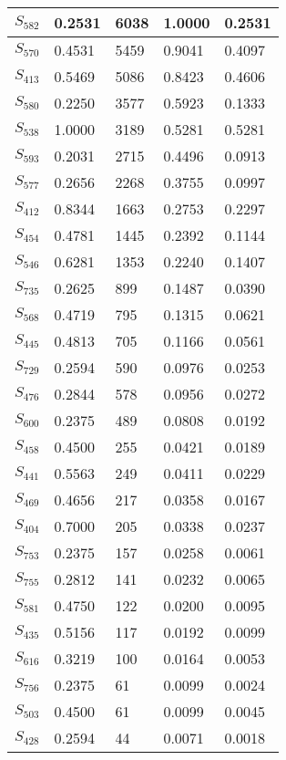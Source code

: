 \begin{xltabular}{\textwidth}{|X|X|X|X|X|}
        \hline
        \endlastfoot
    $S_{582}$ & 0.2531 & 6038 & 1.0000 & 0.2531 \\ \hline
 $S_{570}$ & 0.4531 & 5459 & 0.9041 & 0.4097 \\ \hline
 $S_{413}$ & 0.5469 & 5086 & 0.8423 & 0.4606 \\ \hline
 $S_{580}$ & 0.2250 & 3577 & 0.5923 & 0.1333 \\ \hline
 $S_{538}$ & 1.0000 & 3189 & 0.5281 & 0.5281 \\ \hline
 $S_{593}$ & 0.2031 & 2715 & 0.4496 & 0.0913 \\ \hline
 $S_{577}$ & 0.2656 & 2268 & 0.3755 & 0.0997 \\ \hline
 $S_{412}$ & 0.8344 & 1663 & 0.2753 & 0.2297 \\ \hline
 $S_{454}$ & 0.4781 & 1445 & 0.2392 & 0.1144 \\ \hline
 $S_{546}$ & 0.6281 & 1353 & 0.2240 & 0.1407 \\ \hline
 $S_{735}$ & 0.2625 & 899 & 0.1487 & 0.0390 \\ \hline
 $S_{568}$ & 0.4719 & 795 & 0.1315 & 0.0621 \\ \hline
 $S_{445}$ & 0.4813 & 705 & 0.1166 & 0.0561 \\ \hline
 $S_{729}$ & 0.2594 & 590 & 0.0976 & 0.0253 \\ \hline
 $S_{476}$ & 0.2844 & 578 & 0.0956 & 0.0272 \\ \hline
 $S_{600}$ & 0.2375 & 489 & 0.0808 & 0.0192 \\ \hline
 $S_{458}$ & 0.4500 & 255 & 0.0421 & 0.0189 \\ \hline
 $S_{441}$ & 0.5563 & 249 & 0.0411 & 0.0229 \\ \hline
 $S_{469}$ & 0.4656 & 217 & 0.0358 & 0.0167 \\ \hline
 $S_{404}$ & 0.7000 & 205 & 0.0338 & 0.0237 \\ \hline
 $S_{753}$ & 0.2375 & 157 & 0.0258 & 0.0061 \\ \hline
 $S_{755}$ & 0.2812 & 141 & 0.0232 & 0.0065 \\ \hline
 $S_{581}$ & 0.4750 & 122 & 0.0200 & 0.0095 \\ \hline
 $S_{435}$ & 0.5156 & 117 & 0.0192 & 0.0099 \\ \hline
 $S_{616}$ & 0.3219 & 100 & 0.0164 & 0.0053 \\ \hline
 $S_{756}$ & 0.2375 & 61 & 0.0099 & 0.0024 \\ \hline
 $S_{503}$ & 0.4500 & 61 & 0.0099 & 0.0045 \\ \hline
 $S_{428}$ & 0.2594 & 44 & 0.0071 & 0.0018 \\ \hline

\end{xltabular}
